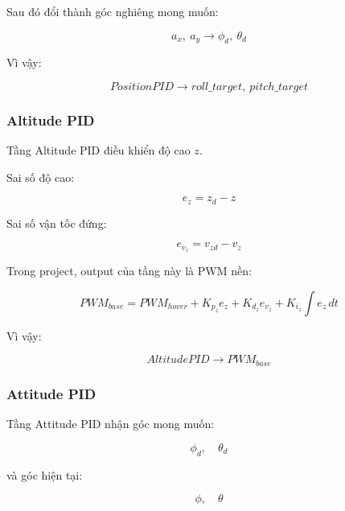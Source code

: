 Sau đó đổi thành góc nghiêng mong muốn:

\begin{equation}
    a_x,\ a_y
    \longrightarrow
    \phi_d,\ \theta_d
\end{equation}

Vì vậy:

\begin{equation}
    \boxed{
    PositionPID
    \longrightarrow
    roll\_target,\ pitch\_target
    }
\end{equation}

\subsubsection{Altitude PID}

Tầng Altitude PID điều khiển độ cao $z$.

Sai số độ cao:

\begin{equation}
    e_z = z_d - z
\end{equation}

Sai số vận tốc đứng:

\begin{equation}
    e_{v_z} = v_{zd} - v_z
\end{equation}

Trong project, output của tầng này là PWM nền:

\begin{equation}
    PWM_{base}
    =
    PWM_{hover}
    +
    K_{p_z}e_z
    +
    K_{d_z}e_{v_z}
    +
    K_{i_z}\int e_z\,dt
\end{equation}

Vì vậy:

\begin{equation}
    \boxed{
    AltitudePID
    \longrightarrow
    PWM_{base}
    }
\end{equation}

\subsubsection{Attitude PID}

Tầng Attitude PID nhận góc mong muốn:

\begin{equation}
    \phi_d,\quad \theta_d
\end{equation}

và góc hiện tại:

\begin{equation}
    \phi,\quad \theta
\end{equation}

